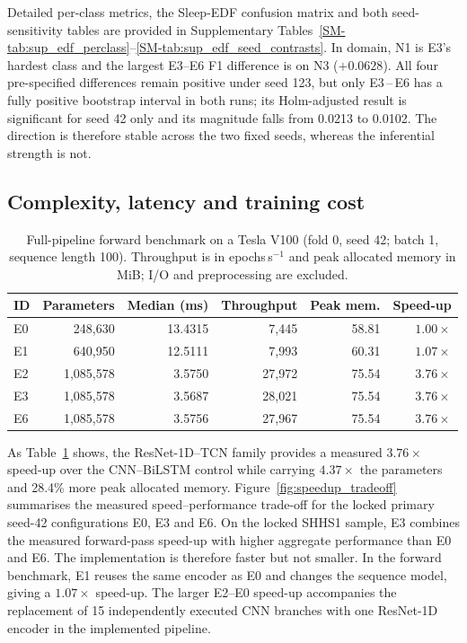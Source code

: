 \documentclass[11pt,a4paper]{article}
\begin{document}
Detailed per-class metrics, the Sleep-EDF confusion matrix and both seed-sensitivity tables are provided
in Supplementary Tables~\ref{SM-tab:sup_edf_perclass}--\ref{SM-tab:sup_edf_seed_contrasts}.
In domain, N1 is E3's hardest class and the largest E3--E6 F1
difference is on N3 ($+0.0628$). All four pre-specified differences remain positive under seed 123, but
only E3\,--\,E6 has a fully positive bootstrap interval in both runs; its Holm-adjusted result is
significant for seed 42 only and its magnitude falls from 0.0213 to 0.0102. The direction is therefore
stable across the two fixed seeds, whereas the inferential strength is not.

\FloatBarrier
\subsection{Complexity, latency and training cost}

\begin{table}[t]
\centering
\caption{Full-pipeline forward benchmark on a Tesla V100 (fold 0, seed 42; batch 1, sequence length
100). Throughput is in epochs\,s$^{-1}$ and peak allocated memory in MiB; I/O and preprocessing are
excluded.}
\label{tab:complexity}
\small
\begin{tabular}{lrrrrr}
\toprule
\textbf{ID} & \textbf{Parameters} & \textbf{Median (ms)} & \textbf{Throughput} & \textbf{Peak mem.} & \textbf{Speed-up} \\
\midrule
E0 & 248{,}630 & 13.4315 & 7{,}445 & 58.81 & $1.00\times$ \\
E1 & 640{,}950 & 12.5111 & 7{,}993 & 60.31 & $1.07\times$ \\
E2 & 1{,}085{,}578 & 3.5750 & 27{,}972 & 75.54 & $3.76\times$ \\
E3 & 1{,}085{,}578 & 3.5687 & 28{,}021 & 75.54 & $3.76\times$ \\
E6 & 1{,}085{,}578 & 3.5756 & 27{,}967 & 75.54 & $3.76\times$ \\
\bottomrule
\end{tabular}
\end{table}

As Table~\ref{tab:complexity} shows, the ResNet-1D--TCN family provides a measured $3.76\times$ speed-up
over the CNN--BiLSTM control while carrying $4.37\times$ the parameters and 28.4\% more peak allocated
memory. Figure~\ref{fig:speedup_tradeoff} summarises the measured speed--performance trade-off for the
locked primary seed-42 configurations E0, E3 and E6. On the locked SHHS1 sample, E3 combines the
measured forward-pass speed-up with higher aggregate performance than E0 and E6. The implementation is
therefore faster but not smaller. In the forward benchmark, E1 reuses the same encoder as E0 and changes
the sequence model, giving a $1.07\times$ speed-up. The larger E2--E0 speed-up accompanies the
replacement of 15 independently executed CNN branches with one ResNet-1D encoder in the implemented
pipeline.
\end{document}
